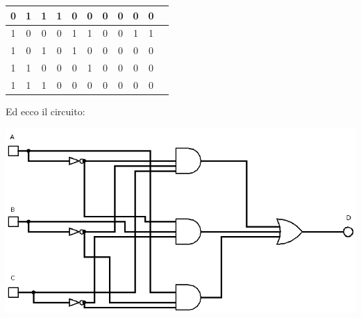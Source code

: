 \documentclass[a4paper,12pt, oneside]{book}
\begin{document}
\begin{esercizio}
\begin{center}
\begin{tabular}{|c|c|c|c|c|c|c|c|c|c|c|}
      \hline
      0   & 1   & 1   & 1              & 0              & 0              & 0                                         & 0                                         & 0                                        & 0            \\
      \hline
      1   & 0   & 0   & 0              & 1              & 1              & 0                                         & 0                                         & 1                                        & 1            \\
      \hline
      1   & 0   & 1   & 0              & 1              & 0              & 0                                         & 0                                         & 0                                        & 0            \\
      \hline
      1   & 1   & 0   & 0              & 0              & 1              & 0                                         & 0                                         & 0                                        & 0            \\
      \hline
      1   & 1   & 1   & 0              & 0              & 0              & 0                                         & 0                                         & 0                                        & 0            \\
      \hline
    \end{tabular}
  \end{center}
  \newpage
  Ed ecco il circuito:
  \begin{center}
    \includegraphics[scale=0.65]{img/es4.png}
  \end{center}
\end{esercizio}
\end{document}
